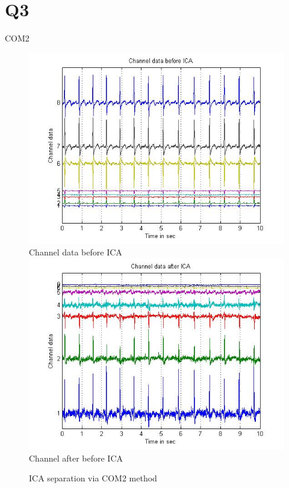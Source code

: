 \documentclass[t,12pt,english
\ifx\beamermode\undefined\else,\beamermode\fi
]{beamer}
\begin{document}
\section{Q3}
\begin{frame}{COM2}

\begin{figure}[!htbp]
%
\centering
\includegraphics[width=1\textwidth]{6.jpg}\\
\tiny{Channel data before ICA}\label{a9}
\endminipage\hfill
{}%
\centering
\includegraphics[width=1\textwidth]{5.jpg}\\
\tiny{Channel after before ICA}\label{a10}
\endminipage\hfill
\caption{\tiny ICA separation via COM2 method}
\end{figure}
  
\end{frame}
\end{document}
